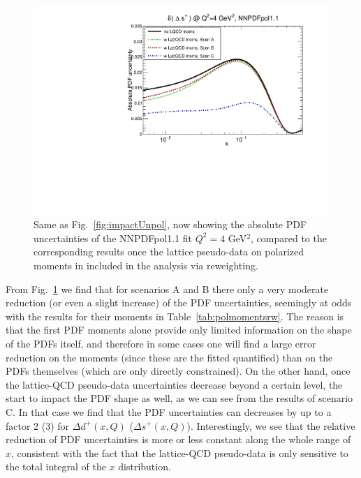 \begin{figure}[!t]
\includegraphics[scale=0.45]{plots/xsp-pol-lattice-relerr.pdf}
\caption{\small Same as Fig.~\ref{fig:impactUnpol}, now
  showing the absolute PDF uncertainties of the NNPDFpol1.1 fit
   $Q^2=4$ GeV$^2$,
  compared to the corresponding results once the lattice pseudo-data
  on polarized moments in included in the analysis via
  reweighting.
}    
\label{fig:impactPol}
\end{figure}

From Fig.~\ref{fig:impactPol} we find that for scenarios
A and B there only a very moderate reduction (or even a slight increase)
of the PDF uncertainties, seemingly at odds with the results
for their moments in Table~\ref{tab:polmomentsrw}.
%
The reason is that the first PDF moments alone provide only limited
information on the shape of the PDFs itself, and therefore in some
cases one will find a large error reduction on the moments (since these
are the fitted quantified) than on the PDFs themselves (which are
only directly constrained).
%
On the other hand, once the lattice-QCD pseudo-data uncertainties
decrease beyond a certain level, the start to impact the PDF shape
as well, as we can see from the results of scenario C.
%
In that case we find that the PDF uncertainties can decreases by up to a factor
2 (3) for $\Delta d^+(x,Q)$ ($\Delta s^+(x,Q)$).
%
Interestingly, we see that the relative reduction of PDF uncertainties is more
or less constant along the whole range of $x$, consistent with the fact that
the lattice-QCD pseudo-data is only sensitive to the total integral
of the $x$ distribution.



